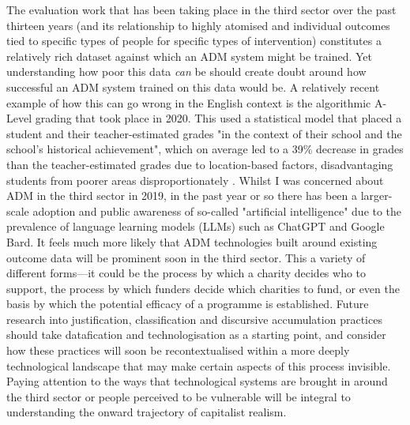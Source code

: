 The evaluation work that has been taking place in the third sector over the past thirteen years (and its relationship to highly atomised and individual outcomes tied to specific types of people for specific types of intervention) constitutes a relatively rich dataset against which an ADM system might be trained. Yet understanding how poor this data \textit{can} be should create doubt around how successful an ADM system trained on this data would be. A relatively recent example of how this can go wrong in the English context is the algorithmic A-Level grading that took place in 2020. This used a statistical model that placed a student and their teacher-estimated grades "in the context of their school and the school’s historical achievement", which on average led to a 39\% decrease in grades than the teacher-estimated grades due to location-based factors, disadvantaging students from poorer areas disproportionately \citep[p. 608]{mead_contested_2023}. Whilst I was concerned about ADM in the third sector in 2019, in the past year or so there has been a larger-scale adoption and public awareness of so-called "artificial intelligence" due to the prevalence of language learning models (LLMs) such as ChatGPT and Google Bard. It feels much more likely that ADM technologies built around existing outcome data will be prominent soon in the third sector. This a variety of different forms—it could be the process by which a charity decides who to support, the process by which funders decide which charities to fund, or even the basis by which the potential efficacy of a programme is established. Future research into justification, classification and discursive accumulation practices should take datafication and technologisation as a starting point, and consider how these practices will soon be recontextualised within a more deeply technological landscape that may make certain aspects of this process invisible. Paying attention to the ways that technological systems are brought in around the third sector or people perceived to be vulnerable will be integral to understanding the onward trajectory of capitalist realism.

